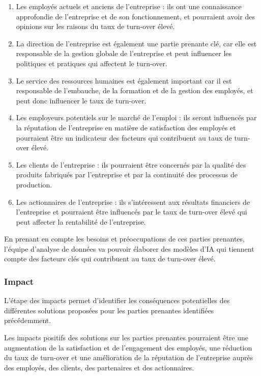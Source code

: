 \begin{enumerate}
    \item Les employés actuels et anciens de l'entreprise : ils ont une connaissance approfondie de l'entreprise et de son fonctionnement, et pourraient avoir des opinions sur les raisons du taux de turn-over élevé. 
    \item La direction de l'entreprise est également une partie prenante clé, car elle est responsable de la gestion globale de l'entreprise et peut influencer les politiques et pratiques qui affectent le turn-over. 
    \item Le service des ressources humaines est également important car il est responsable de l'embauche, de la formation et de la gestion des employés, et peut donc influencer le taux de turn-over. 
    \item Les employeurs potentiels sur le marché de l'emploi : ils seront influencés par la réputation de l'entreprise en matière de satisfaction des employés et pourraient être un indicateur des facteurs qui contribuent au taux de turn-over élevé. 
    \item Les clients de l'entreprise : ils pourraient être concernés par la qualité des produits fabriqués par l'entreprise et par la continuité des processus de production. 
    \item Les actionnaires de l'entreprise : ils s'intéressent aux résultats financiers de l'entreprise et pourraient être influencés par le taux de turn-over élevé qui peut affecter la rentabilité de l'entreprise. 
\end{enumerate}
En prenant en compte les besoins et préoccupations de ces parties prenantes, l'équipe d'analyse de données va pouvoir élaborer des modèles d'IA qui tiennent compte des facteurs clés qui contribuent au taux de turn-over élevé. 

\subsubsection{Impact}
L'étape des impacts permet d'identifier les conséquences potentielles des différentes solutions proposées pour les parties prenantes identifiées précédemment. 

Les impacts positifs des solutions sur les parties prenantes pourraient être une augmentation de la satisfaction et de l'engagement des employés, une réduction du taux de turn-over et une amélioration de la réputation de l'entreprise auprès des employés, des clients, des partenaires et des actionnaires. 

